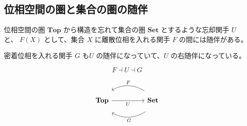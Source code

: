\documentclass[uplatex,a4j,12pt,dvipdfmx]{jsarticle}
\begin{document}
\subsection{位相空間の圏と集合の圏の随伴}

位相空間の圏 $\mathbf{Top}$ から構造を忘れて集合の圏 $\mathbf{Set}$ とするような忘却関手 $U$ と、
$F(X)$ として、集合 $X$ に離散位相を入れる関手 $F$ の間には随伴がある。

密着位相を入れる関手 $G$ も$U$ の随伴になっていて、$U$ の右随伴になっている。

$$
	F \dashv U \dashv G
$$

\[
	\begin{tikzcd}
		\mathbf{Top} \arrow[rr, "U"'] &  & \mathbf{Set} \arrow[ll, "F"', bend right, shift right=3] \arrow[ll, "G", bend left, shift left=4]
	\end{tikzcd}
\]
\end{document}
